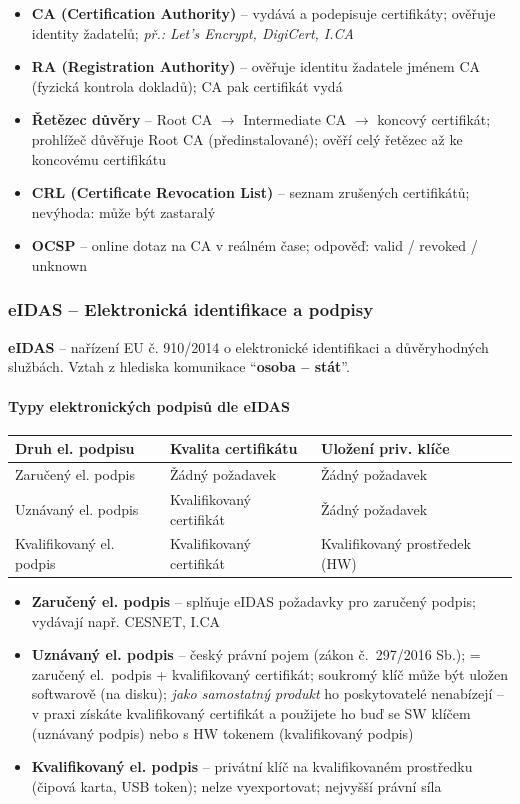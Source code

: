 \begin{itemize}
  \item \textbf{CA (Certification Authority)} -- vydává a podepisuje certifikáty; ověřuje identity žadatelů; \textit{př.: Let's Encrypt, DigiCert, I.CA}
  \item \textbf{RA (Registration Authority)} -- ověřuje identitu žadatele jménem CA (fyzická kontrola dokladů); CA pak certifikát vydá
  \item \textbf{Řetězec důvěry} -- Root CA $\to$ Intermediate CA $\to$ koncový certifikát; prohlížeč důvěřuje Root CA (předinstalované); ověří celý řetězec až ke koncovému certifikátu
  \item \textbf{CRL (Certificate Revocation List)} -- seznam zrušených certifikátů; nevýhoda: může být zastaralý
  \item \textbf{OCSP} -- online dotaz na CA v reálném čase; odpověď: valid / revoked / unknown
\end{itemize}

\subsubsection{eIDAS -- Elektronická identifikace a podpisy}

\textbf{eIDAS} -- nařízení EU č. 910/2014 o elektronické identifikaci a důvěryhodných službách.
Vztah z hlediska komunikace ``\textbf{osoba -- stát}''.

\paragraph{Typy elektronických podpisů dle eIDAS}
\begin{center}
\begin{tabular}{lll}
\toprule
\textbf{Druh el. podpisu} & \textbf{Kvalita certifikátu} & \textbf{Uložení priv. klíče} \\
\midrule
Zaručený el. podpis & Žádný požadavek & Žádný požadavek \\
Uznávaný el. podpis & Kvalifikovaný certifikát & Žádný požadavek \\
Kvalifikovaný el. podpis & Kvalifikovaný certifikát & Kvalifikovaný prostředek (HW) \\
\bottomrule
\end{tabular}
\end{center}

\begin{itemize}
  \item \textbf{Zaručený el. podpis} -- splňuje eIDAS požadavky pro zaručený podpis; vydávají např. CESNET, I.CA
  \item \textbf{Uznávaný el. podpis} -- český právní pojem (zákon č.\ 297/2016 Sb.); = zaručený el.\ podpis + kvalifikovaný certifikát; soukromý klíč může být uložen softwarově (na disku); \textit{jako samostatný produkt} ho poskytovatelé nenabízejí -- v praxi získáte kvalifikovaný certifikát a použijete ho buď se SW klíčem (uznávaný podpis) nebo s HW tokenem (kvalifikovaný podpis)
  \item \textbf{Kvalifikovaný el. podpis} -- privátní klíč na kvalifikovaném prostředku (čipová karta, USB token); nelze vyexportovat; nejvyšší právní síla
\end{itemize}

